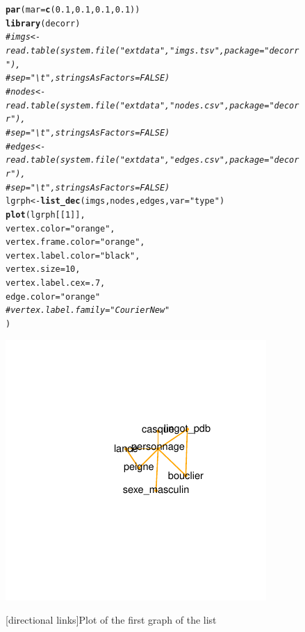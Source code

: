 \documentclass[article]{jss}\usepackage[]{graphicx}\usepackage[]{color}
\makeatletter
\def\maxwidth{ %
  \ifdim\Gin@nat@width>\linewidth
    \linewidth
  \else
    \Gin@nat@width
  \fi
}
\newcommand{\hlnum}[1]{\textcolor[rgb]{0.686,0.059,0.569}{#1}}%
\newcommand{\hlstr}[1]{\textcolor[rgb]{0.192,0.494,0.8}{#1}}%
\newcommand{\hlcom}[1]{\textcolor[rgb]{0.678,0.584,0.686}{\textit{#1}}}%
\newcommand{\hlstd}[1]{\textcolor[rgb]{0.345,0.345,0.345}{#1}}%
\newcommand{\hlkwb}[1]{\textcolor[rgb]{0.69,0.353,0.396}{#1}}%
\newcommand{\hlkwc}[1]{\textcolor[rgb]{0.333,0.667,0.333}{#1}}%
\newcommand{\hlkwd}[1]{\textcolor[rgb]{0.737,0.353,0.396}{\textbf{#1}}}%
\newenvironment{kframe}{%
 \def\at@end@of@kframe{}%
 \ifinner\ifhmode%
  \def\at@end@of@kframe{\end{minipage}}%
  \begin{minipage}{\columnwidth}%
 \fi\fi%
 \def\FrameCommand##1{\hskip\@totalleftmargin \hskip-\fboxsep
 \colorbox{shadecolor}{##1}\hskip-\fboxsep
     \hskip-\linewidth \hskip-\@totalleftmargin \hskip\columnwidth}%
 \MakeFramed {\advance\hsize-\width
   \@totalleftmargin\z@ \linewidth\hsize
   \@setminipage}}%
 {\par\unskip\endMakeFramed%
 \at@end@of@kframe}
\newenvironment{knitrout}{}{} %
\makeatother
\begin{document}
\begin{figure}[H]
\begin{knitrout}
\color{fgcolor}\begin{kframe}
\begin{alltt}
\hlkwd{par}\hlstd{(}\hlkwc{mar}\hlstd{=}\hlkwd{c}\hlstd{(}\hlnum{0.1}\hlstd{,}\hlnum{0.1}\hlstd{,}\hlnum{0.1}\hlstd{,}\hlnum{0.1}\hlstd{) )}
\hlkwd{library}\hlstd{(decorr)}
\hlcom{# imgs <- read.table(system.file("extdata", "imgs.tsv", package = "decorr"),}
\hlcom{#                       sep="\textbackslash{}t", stringsAsFactors = FALSE)}
\hlcom{# nodes <- read.table(system.file("extdata", "nodes.csv", package = "decorr"),}
\hlcom{#                     sep="\textbackslash{}t",stringsAsFactors = FALSE)}
\hlcom{# edges <- read.table(system.file("extdata", "edges.csv", package = "decorr"),}
\hlcom{#                     sep="\textbackslash{}t",stringsAsFactors = FALSE)}
\hlstd{lgrph} \hlkwb{<-} \hlkwd{list_dec}\hlstd{(imgs,nodes,edges,}\hlkwc{var}\hlstd{=}\hlstr{"type"}\hlstd{)}
\hlkwd{plot}\hlstd{(lgrph[[}\hlnum{1}\hlstd{]],}
     \hlkwc{vertex.color} \hlstd{=} \hlstr{"orange"}\hlstd{,}
     \hlkwc{vertex.frame.color}\hlstd{=}\hlstr{"orange"}\hlstd{,}
     \hlkwc{vertex.label.color} \hlstd{=} \hlstr{"black"}\hlstd{,}
     \hlkwc{vertex.size} \hlstd{=} \hlnum{10}\hlstd{,}
     \hlkwc{vertex.label.cex} \hlstd{=}\hlnum{.7}\hlstd{,}
     \hlkwc{edge.color} \hlstd{=} \hlstr{"orange"}
     \hlcom{# vertex.label.family="Courier New"}
     \hlstd{)}
\end{alltt}
\end{kframe}
\includegraphics[width=\maxwidth]{figure/unnamed-chunk-8-1} 

\end{knitrout}
[directional links]{Plot of the first graph of the list}
\end{figure}
\end{document}
